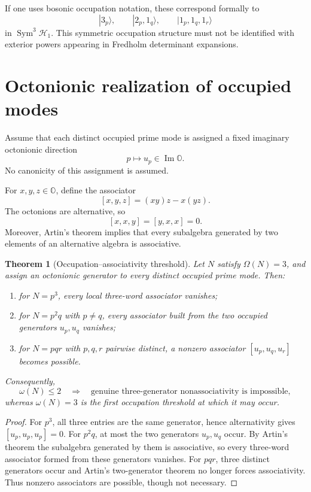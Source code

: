 \documentclass[11pt,a4paper]{article}
\newtheorem{theorem}{Theorem}[section]
\theoremstyle{definition}
\theoremstyle{remark}
\newcommand{\OO}{\mathbb O}
\newcommand{\Sym}{\operatorname{Sym}}
\begin{document}
If one uses bosonic occupation notation, these correspond formally to
\[
|3_p\rangle,\qquad |2_p,1_q\rangle,\qquad |1_p,1_q,1_r\rangle
\]
in $\Sym^3\mathcal H_1$. This symmetric occupation structure must not be identified with exterior powers appearing in Fredholm determinant expansions.

\section{Octonionic realization of occupied modes}
Assume that each distinct occupied prime mode is assigned a fixed imaginary octonionic direction
\[
p\longmapsto u_p\in\operatorname{Im}\OO.
\]
No canonicity of this assignment is assumed.

For $x,y,z\in\OO$, define the associator
\[
[x,y,z]=(xy)z-x(yz).
\]
The octonions are alternative, so
\[
[x,x,y]=[y,x,x]=0.
\]
Moreover, Artin's theorem implies that every subalgebra generated by two elements of an alternative algebra is associative.

\begin{theorem}[Occupation--associativity threshold]\label{thm:threshold}
Let $N$ satisfy $\Omega(N)=3$, and assign an octonionic generator to every distinct occupied prime mode. Then:
\begin{enumerate}[label=(\roman*)]
\item for $N=p^3$, every local three-word associator vanishes;
\item for $N=p^2q$ with $p\ne q$, every associator built from the two occupied generators $u_p,u_q$ vanishes;
\item for $N=pqr$ with $p,q,r$ pairwise distinct, a nonzero associator $[u_p,u_q,u_r]$ becomes possible.
\end{enumerate}
Consequently,
\[
\omega(N)\le2
\quad\Longrightarrow\quad
\text{genuine three-generator nonassociativity is impossible},
\]
whereas $\omega(N)=3$ is the first occupation threshold at which it may occur.
\end{theorem}

\begin{proof}
For $p^3$, all three entries are the same generator, hence alternativity gives $[u_p,u_p,u_p]=0$. For $p^2q$, at most the two generators $u_p,u_q$ occur. By Artin's theorem the subalgebra generated by them is associative, so every three-word associator formed from these generators vanishes. For $pqr$, three distinct generators occur and Artin's two-generator theorem no longer forces associativity. Thus nonzero associators are possible, though not necessary.
\end{proof}
\end{document}
